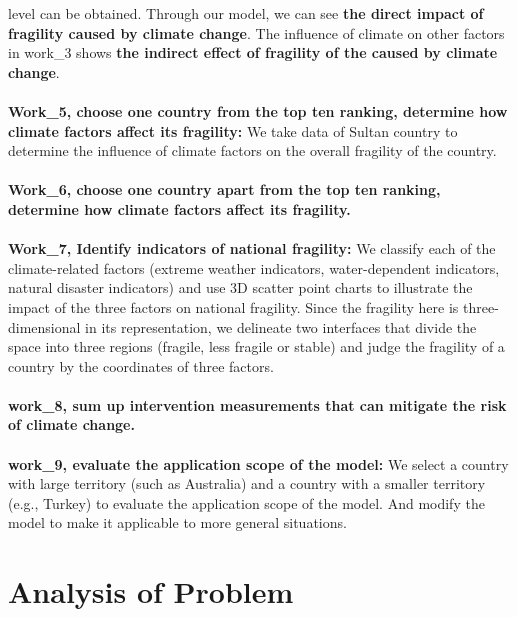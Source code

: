 \documentclass{mcmthesis}
\begin{document}
  level  can be obtained. Through our model, we can see \textbf{the direct impact of fragility 
  caused by climate change}. The influence of climate on other factors in work\_3 shows \textbf{the 
  indirect effect of fragility of the caused by climate change}.\\\\
  \textbf{Work\_5, choose one country from the top ten ranking, determine how climate 
  factors affect its fragility:} We take data of Sultan country to determine the 
  influence of climate factors on the overall fragility of the country.\\\\ 
  \textbf{Work\_6, choose one country apart from the top ten ranking, determine how 
  climate factors affect its fragility.}\\\\
  \textbf{Work\_7, Identify indicators of national fragility:} We classify each of 
  the climate-related factors (extreme weather indicators, water-dependent indicators, 
  natural disaster indicators) and use 3D scatter point charts to illustrate the impact 
  of the three factors on national fragility. 
  Since the fragility here is three-dimensional 
  in its representation, we delineate two interfaces 
  that divide the space into three regions (fragile, 
  less fragile or stable) and judge the fragility 
  of a country by the coordinates of three factors.\\\\
  \textbf{work\_8, sum up intervention measurements that can mitigate the risk of climate change.}\\\\
  \textbf{work\_9, evaluate the application scope of the model:} We select a country with large 
  territory (such as Australia) and a country with a smaller territory (e.g., 
  Turkey) to evaluate the application scope of the model. And modify the model 
  to make it applicable to more general situations.
\section{Analysis of Problem}
\end{document}
